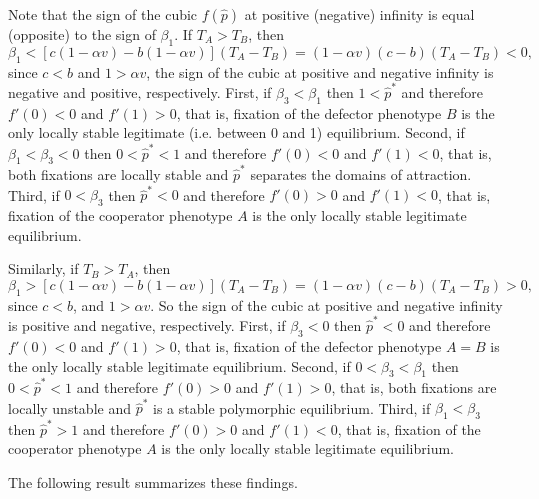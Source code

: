 \documentclass[12pt]{extarticle}
\begin{document}
Note that the sign of the cubic $f(\hat{p})$ at positive (negative) infinity is equal (opposite) to the sign of $\beta_1$. 
If $T_A>T_B$, then 
\begin{equation} \label{eq:beta1}
   \beta_1 %
   < [c(1-\alpha v) - b(1-\alpha v)] (T_A-T_B) 
   = (1-\alpha v)(c-b)(T_A-T_B) < 0 ,
 \end{equation}
since $c<b$ and $1>\alpha v$, the sign of the cubic at positive and negative infinity is negative and positive, respectively.
First, if $\beta_3<\beta_1$ then 
$1<\hat{p}^*$ and therefore $f'(0)<0$ and $f'(1)>0$, that is, fixation of the defector phenotype $B$ is the only locally stable legitimate (i.e. between 0 and 1) equilibrium.
Second, if $\beta_1<\beta_3<0$ then 
$0<\hat{p}^*<1$ and therefore $f'(0)<0$ and $f'(1)<0$, that is, both fixations are locally stable and $\hat{p}^*$ separates the domains of attraction.
Third, if $0<\beta_3$ then 
$\hat{p}^*<0$ and therefore $f'(0)>0$ and $f'(1)<0$, that is, fixation of the cooperator phenotype $A$ is the only locally stable legitimate equilibrium.


Similarly, if $T_B>T_A$, then
\begin{equation} \label{eq:beta1_rev}
   \beta_1 %
   > [c(1-\alpha v) - b(1-\alpha v)] (T_A-T_B) 
   = (1-\alpha v)(c-b)(T_A-T_B) > 0,
 \end{equation}
since $c<b$, and $1>\alpha v$. So the sign of the cubic at positive and negative infinity is positive and negative, respectively. 
First, if $\beta_3<0$ then $\hat{p}^*<0$ and therefore $f'(0)<0$ and $f'(1)>0$, that is, fixation of the defector phenotype $A=B$ is the only locally stable legitimate equilibrium.
Second, if $0<\beta_3<\beta_1$ then $0<\hat{p}^*<1$ and therefore $f'(0)>0$ and $f'(1)>0$, that is, both fixations are locally unstable and $\hat{p}^*$ is a stable polymorphic equilibrium.
Third, if $\beta_1<\beta_3$ then $\hat{p}^*>1$ and therefore $f'(0)>0$ and $f'(1)<0$, that is, fixation of the cooperator phenotype $A$ is the only locally stable legitimate equilibrium.

The following result summarizes these findings.
\end{document}
